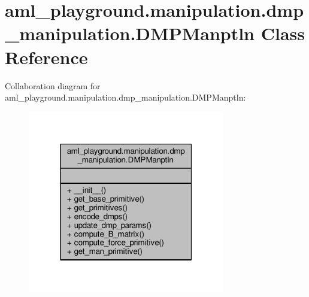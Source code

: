 \hypertarget{classaml__playground_1_1manipulation_1_1dmp__manipulation_1_1_d_m_p_manptln}{\section{aml\-\_\-playground.\-manipulation.\-dmp\-\_\-manipulation.\-D\-M\-P\-Manptln Class Reference}
\label{classaml__playground_1_1manipulation_1_1dmp__manipulation_1_1_d_m_p_manptln}
}


Collaboration diagram for aml\-\_\-playground.\-manipulation.\-dmp\-\_\-manipulation.\-D\-M\-P\-Manptln\-:
\nopagebreak
\begin{figure}[H]
\begin{center}
\leavevmode
\includegraphics[width=244pt]{classaml__playground_1_1manipulation_1_1dmp__manipulation_1_1_d_m_p_manptln__coll__graph}
\end{center}
\end{figure}

